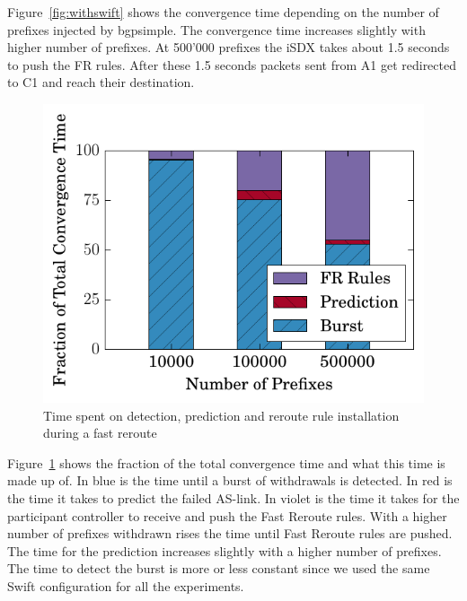 Figure~\ref{fig:withswift} shows the convergence time depending on the number of prefixes injected by bgpsimple.
The convergence time increases slightly with higher number of prefixes. At 500'000 prefixes the iSDX takes about 1.5 seconds to push the FR rules. After these 1.5 seconds packets sent from A1 get redirected to C1 and reach their destination. \\

\begin{figure}[h]
\center
\includegraphics[scale = 1]{Figures/barplot.pdf}
\caption{Time spent on detection, prediction and reroute rule installation during a fast reroute}
\label{fig:activities}
\end{figure}

Figure~\ref{fig:activities} shows the fraction of the total convergence time and what this time is made up of. In blue is the time until a burst of withdrawals is detected. In red is the time it takes to predict the failed AS-link. In violet is the time it takes for the participant controller to receive and push the Fast Reroute rules. With a higher number of prefixes withdrawn rises the time until Fast Reroute rules are pushed. The time for the prediction increases slightly with a higher number of prefixes. The time to detect the burst is more or less constant since we used the same Swift configuration for all the experiments. 

